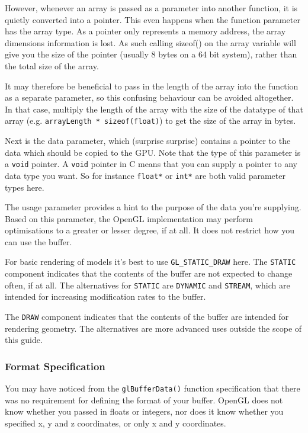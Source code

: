 However, whenever an array is passed as a parameter into another function, it is quietly converted into a pointer. This even happens when the function parameter has the array type. As a pointer only represents a memory address, the array dimensions information is lost. As such calling sizeof() on the array variable will give you the size of the pointer (usually 8 bytes on a 64 bit system), rather than the total size of the array.

It may therefore be beneficial to pass in the length of the array into the function as a separate parameter, so this confusing behaviour can be avoided altogether. In that case, multiply the length of the array with the size of the datatype of that array (e.g. \texttt{arrayLength * sizeof(float)}) to get the size of the array in bytes.

Next is the data parameter, which (surprise surprise) contains a pointer to the data which should be copied to the GPU. Note that the type of this parameter is a \texttt{void} pointer. A \texttt{void} pointer in C means that you can supply a pointer to any data type you want. So for instance \texttt{float*} or \texttt{int*} are both valid parameter types here.

The usage parameter provides a hint to the purpose of the data you're supplying. Based on this parameter, the OpenGL implementation may perform optimisations to a greater or lesser degree, if at all. It does not restrict how you can use the buffer. 

For basic rendering of models it's best to use \texttt{GL_STATIC_DRAW} here. The \texttt{STATIC} component indicates that the contents of the buffer are not expected to change often, if at all. The alternatives for \texttt{STATIC} are \texttt{DYNAMIC} and \texttt{STREAM}, which are intended for increasing modification rates to the buffer.

The \texttt{DRAW} component indicates that the contents of the buffer are intended for rendering geometry. The alternatives are more advanced uses outside the scope of this guide.

\subsubsection{Format Specification}

You may have noticed from the \texttt{glBufferData()} function specification that there was no requirement for defining the format of your buffer. OpenGL does not know whether you passed in floats or integers, nor does it know whether you specified x, y and z coordinates, or only x and y coordinates.

